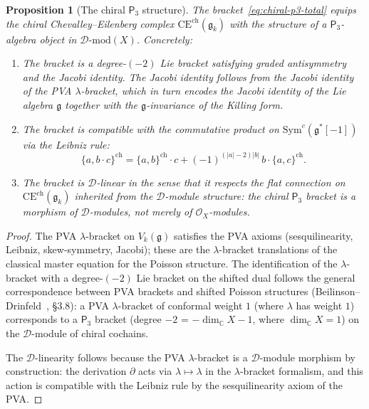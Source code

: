 \documentclass[11pt,reqno]{amsart}
\newtheorem{proposition}[theorem]{Proposition}
\theoremstyle{definition}
\theoremstyle{remark}
\newcommand{\cD}{\mathcal{D}}
\newcommand{\cO}{\mathcal{O}}
\newcommand{\CE}{\mathrm{CE}}
\newcommand{\Pthree}{\mathsf{P}_{3}}
\newcommand{\Sym}{\mathrm{Sym}}
\newcommand{\fg}{\mathfrak{g}}
\newcommand{\CC}{\mathbb{C}}
\numberwithin{equation}{section}
\begin{document}
\begin{proposition}[The chiral $\Pthree$ structure]
\label{prop:chiral-p3-structure}
The bracket~\eqref{eq:chiral-p3-total} equips the chiral
Chevalley--Eilenberg complex $\CE^{\mathrm{ch}}(\fg_k)$
with the structure of a $\Pthree$-algebra object in
$\cD\textrm{-}\mathrm{mod}(X)$. Concretely:
\begin{enumerate}[label=\textup{(\roman*)}]
\item The bracket is a degree-$(-2)$ Lie bracket satisfying
  graded antisymmetry and the Jacobi identity.
  The Jacobi identity follows from the Jacobi identity of the
  PVA $\lambda$-bracket, which in turn encodes the Jacobi
  identity of the Lie algebra $\fg$ together with the
  $\fg$-invariance of the Killing form.
\item The bracket is compatible with the commutative product
  on $\Sym^c(\fg^*[-1])$ via the Leibniz rule:
  \[
    \{a, b \cdot c\}^{\mathrm{ch}}
    = \{a, b\}^{\mathrm{ch}} \cdot c
    + (-1)^{(|a|-2)|b|}\, b \cdot \{a, c\}^{\mathrm{ch}}.
  \]
\item The bracket is $\cD$-linear in the sense that it
  respects the flat connection on
  $\CE^{\mathrm{ch}}(\fg_k)$ inherited from the
  $\cD$-module structure: the chiral $\Pthree$ bracket
  is a morphism of $\cD$-modules, not merely of
  $\cO_X$-modules.
\end{enumerate}
\end{proposition}

\begin{proof}
The PVA $\lambda$-bracket on $V_k(\fg)$ satisfies the PVA
axioms (sesquilinearity, Leibniz, skew-symmetry, Jacobi);
these are the $\lambda$-bracket translations of the classical
master equation for the Poisson structure.
The identification of the $\lambda$-bracket with a
degree-$(-2)$ Lie bracket on the shifted dual follows the
general correspondence between PVA brackets and shifted
Poisson structures (Beilinson--Drinfeld~\cite{BD04},
\S3.8): a PVA $\lambda$-bracket of conformal weight $1$
(where $\lambda$ has weight $1$) corresponds to a
$\Pthree$ bracket (degree $-2$ = $-\dim_\CC X - 1$, where
$\dim_\CC X = 1$) on the $\cD$-module of chiral cochains.

The $\cD$-linearity follows because the PVA
$\lambda$-bracket is a $\cD$-module morphism by construction:
the derivation $\partial$ acts via $\lambda \mapsto \lambda$
in the $\lambda$-bracket formalism, and this action is
compatible with the Leibniz rule by the sesquilinearity
axiom of the PVA.
\end{proof}
\end{document}
